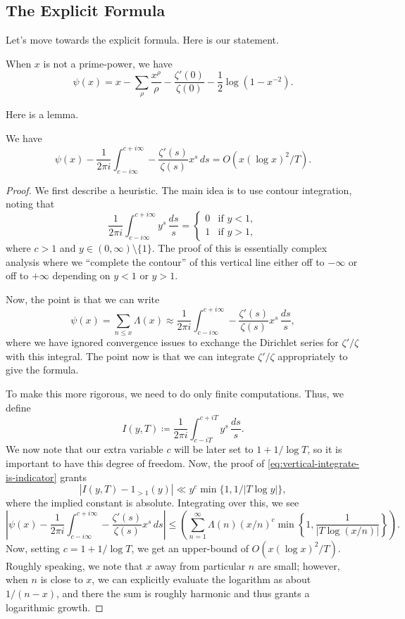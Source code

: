 \documentclass[../notes.tex]{subfiles}
\begin{document}
\subsection{The Explicit Formula}
Let's move towards the explicit formula. Here is our statement.
\begin{theorem}
	When $x$ is not a prime-power, we have
	\[\psi(x)=x-\sum_\rho\frac{x^\rho}\rho-\frac{\zeta'(0)}{\zeta(0)}-\frac12\log\left(1-x^{-2}\right).\]
\end{theorem}
Here is a lemma.
\begin{lemma}
	We have
	\[\psi(x)-\frac1{2\pi i}\int_{c-i\infty}^{c+i\infty}-\frac{\zeta'(s)}{\zeta(s)}x^s\,ds=O\left(x(\log x)^2/T\right).\]
\end{lemma}
\begin{proof}
	We first describe a heuristic. The main idea is to use contour integration, noting that
	\begin{equation}
		\frac1{2\pi i}\int_{c-i\infty}^{c+i\infty}y^s\,\frac{ds}s=\begin{cases}
			0 & \text{if }y<1, \\
			1 & \text{if }y>1,
		\end{cases} \label{eq:vertical-integrate-is-indicator}
	\end{equation}
	where $c>1$ and $y\in(0,\infty)\setminus\{1\}$. The proof of this is essentially complex analysis where we ``complete the contour'' of this vertical line either off to $-\infty$ or off to $+\infty$ depending on $y<1$ or $y>1$.
	
	Now, the point is that we can write
	\[\psi(x)=\sum_{n\le x}\Lambda(x)\approx\frac1{2\pi i}\int_{c-i\infty}^{c+i\infty}-\frac{\zeta'(s)}{\zeta(s)}x^s\,\frac{ds}s,\]
	where we have ignored convergence issues to exchange the Dirichlet series for $\zeta'/\zeta$ with this integral. The point now is that we can integrate $\zeta'/\zeta$ appropriately to give the formula.
	
	To make this more rigorous, we need to do only finite computations. Thus, we define
	\[I(y,T)\coloneqq\frac1{2\pi i}\int_{c-iT}^{c+iT}y^s\,\frac{ds}s.\]
	We now note that our extra variable $c$ will be later set to $1+1/\log T$, so it is important to have this degree of freedom. Now, the proof of \eqref{eq:vertical-integrate-is-indicator} grants
	\[|I(y,T)-1_{>1}(y)|\ll y^c\min\{1,1/|T\log y|\},\]
	where the implied constant is absolute. Integrating over this, we see
	\[\left|\psi(x)-\frac1{2\pi i}\int_{c-i\infty}^{c+i\infty}-\frac{\zeta'(s)}{\zeta(s)}x^s\,ds\right|\le\left(\sum_{n=1}^\infty\Lambda(n)(x/n)^c\min\left\{1,\frac1{|T\log(x/n)|}\right\}\right).\]
	Now, setting $c=1+1/\log T$, we get an upper-bound of $O\left(x(\log x)^2/T\right)$. Roughly speaking, we note that $x$ away from particular $n$ are small; however, when $n$ is close to $x$, we can explicitly evaluate the logarithm as about $1/(n-x)$, and there the sum is roughly harmonic and thus grants a logarithmic growth.
\end{proof}
\end{document}
